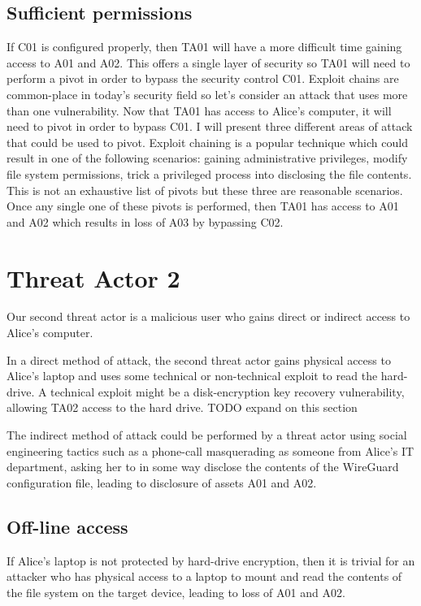\documentclass [11pt, proquest] {uwthesis}[2020/02/24]
\begin{document}
\subsection{Sufficient permissions}
If C01 is configured properly, then TA01 will have a more difficult time gaining access to A01 and A02. This offers a single layer of security so TA01 will need to perform a pivot in order to bypass the security control C01. Exploit chains are common-place in today's security field so let's consider an attack that uses more than one vulnerability. Now that TA01 has access to Alice's computer, it will need to pivot in order to bypass C01. I will present three different areas of attack that could be used to pivot. Exploit chaining is a popular technique which could result in one of the following scenarios: gaining administrative privileges, modify file system permissions, trick a privileged process into disclosing the file contents. This is not an exhaustive list of pivots but these three are reasonable scenarios. Once any single one of these pivots is performed, then TA01 has access to A01 and A02 which results in loss of A03 by bypassing C02.

\section{Threat Actor 2}
Our second threat actor is a malicious user who gains direct or indirect access to Alice's computer. 

In a direct method of attack, the second threat actor gains physical access to Alice's laptop and uses some technical or non-technical exploit to read the hard-drive. A technical exploit might be a disk-encryption key recovery vulnerability, allowing TA02 access to the hard drive. TODO expand on this section

The indirect method of attack could be performed by a threat actor using social engineering tactics such as a phone-call masquerading as someone from Alice's IT department, asking her to in some way disclose the contents of the WireGuard configuration file, leading to disclosure of assets A01 and A02.


\subsection{Off-line access}
If Alice's laptop is not protected by hard-drive encryption, then it is trivial for an attacker who has physical access to a laptop to mount and read the contents of the file system on the target device, leading to loss of A01 and A02.
\end{document}
